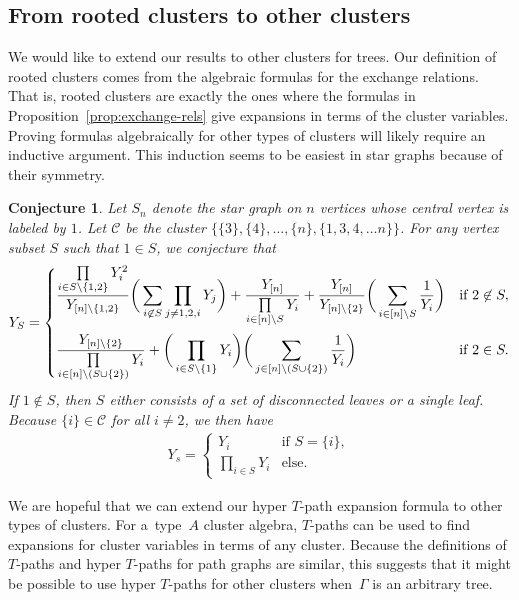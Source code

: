 \documentclass[10pt,a4paper]{amsart}
\numberwithin{equation}{section}
\newtheorem{Conjecture}[Theorem]{Conjecture}
\begin{document}
\subsection{From rooted clusters to other clusters}
We would like to extend our results to other clusters for trees.
Our definition of rooted clusters comes from the algebraic formulas for the exchange relations. That is, rooted clusters are exactly the ones where the formulas in Proposition~\ref{prop:exchange-rels} give expansions in terms of the cluster variables. Proving formulas algebraically for other types of clusters will likely require an inductive argument. This induction seems to be easiest in star graphs because of their symmetry.
\begin{Conjecture}
Let $S_n$ denote the star graph on $n$ vertices whose central vertex is labeled by $1$. Let $\mathcal{C}$ be the cluster $\{ \{3 \}, \{ 4 \}, \dots, \{ n \}, \{ 1, 3, 4, \dots n \} \}$. For any vertex subset $S$ such that $1 \in S$, we conjecture that
\begin{align*}
 Y_S = \begin{cases}
 \displaystyle\frac{\prod\limits_{i \in S \backslash \{ 1, 2 \}} Y_i^2}{Y_{[n] \backslash \{ 1, 2 \}}} \bigg( \sum\limits_{i \not\in S} \prod\limits_{j \neq 1, 2, i} Y_j \bigg) + \frac{Y_{[n]}}{\prod\limits_{i \in [n] \backslash S} Y_i} + \frac{Y_{[n]}}{Y_{[n] \backslash \{ 2 \}}} \bigg( \sum\limits_{i \in [n] \backslash S} \frac{1}{Y_i} \bigg) & \textrm{if } 2 \not\in S, \vspace{2mm}\\
 \displaystyle \frac{Y_{[n] \backslash \{ 2 \}}}{\prod\limits_{i \in [n] \backslash (S \cup \{ 2 \})} Y_i} + \bigg(\prod\limits_{i \in S \backslash \{ 1 \}} Y_i \bigg) \bigg( \sum\limits_{j \in [n] \backslash (S \cup \{ 2 \})} \frac{1}{Y_i} \bigg) & \textrm{if } 2 \in S.
 \end{cases}
\end{align*}
If $1 \not\in S$, then $S$ either consists of a set of disconnected leaves or a single leaf. Because $\{ i \} \in \mathcal{C}$ for all $i \neq 2$, we then have
\begin{align*}
 Y_s = \begin{cases}
 Y_{i} & \textrm{if }S = \{ i \}, \\
 \prod\limits_{i \in S} Y_i & \textrm{else}.
 \end{cases}
\end{align*}
\end{Conjecture}
We are hopeful that we can extend our hyper $T$-path expansion formula to other types of clusters. For a~type~$A$ cluster algebra, $T$-paths can be used to find expansions for cluster variables in terms of any cluster. Because the definitions of $T$-paths and hyper $T$-paths for path graphs are similar, this suggests that it might be possible to use hyper $T$-paths for other clusters when~$\Gamma$ is an arbitrary tree.
\end{document}
